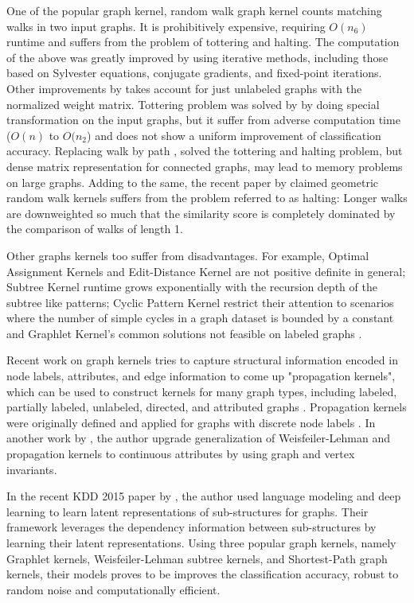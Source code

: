 \documentclass[12pt,a4paper]{article}
\numberwithin{equation}{section}
\numberwithin{figure}{section}
\numberwithin{table}{section}
\begin{document}
One of the popular graph kernel, random walk graph kernel \citep{Gartner2003, Kashima2003} counts matching walks in two input graphs. It is prohibitively expensive, requiring $O(n_{6})$ runtime and suffers from the problem of tottering and halting. The computation of the above was greatly improved by \citet{Vishwanathan2007} using iterative methods, including those based on Sylvester equations, conjugate gradients, and fixed-point iterations. Other improvements by \citet{Kang2012} takes account for just unlabeled graphs with the normalized weight matrix. Tottering problem was solved by \citet{Mahe2004} by doing special transformation on the input graphs, but it suffer from adverse computation time ($O(n)$ to $O(n_{2}$) and does not show a uniform improvement of classification accuracy. Replacing walk by path \citet{Borgwardt2005}, solved the tottering and  halting problem, but dense matrix representation for connected graphs, may lead to memory problems on large graphs. Adding to the same, the recent paper by \citet{Sugiyama2015} claimed geometric random walk kernels suffers from the problem  referred to as halting: Longer walks are downweighted so much that the similarity score is completely dominated by the comparison of walks of length 1.

Other graphs kernels too suffer from disadvantages. For example, Optimal Assignment Kernels and Edit-Distance Kernel are not positive definite in general; Subtree Kernel runtime grows exponentially with the recursion depth of the subtree like patterns; Cyclic Pattern Kernel restrict their attention to scenarios where the number of simple cycles in a graph dataset is bounded by a constant and Graphlet Kernel's common solutions not feasible on labeled graphs \citep{Vishwanathan2010}.

Recent work on graph kernels tries to capture structural information encoded in node labels, attributes, and edge information to come up "propagation kernels", which can be used to construct kernels for many graph types, including labeled, partially labeled, unlabeled, directed, and attributed graphs \citep{Neumann2015}. Propagation kernels were originally defined and applied for graphs with discrete node labels \citep{Shervashidze2011}. In another work by \citet{Francesco2015}, the author upgrade generalization of Weisfeiler-Lehman \citep{Shervashidze2011} and propagation kernels \citep{Neumann2015} to continuous attributes by using graph and vertex invariants.

In the recent KDD 2015 paper by \citet{Yanardag2015}, the author used language modeling and deep learning to learn latent representations of sub-structures for graphs. Their framework leverages the dependency information between sub-structures by learning their latent representations. Using three popular graph kernels, namely Graphlet kernels, Weisfeiler-Lehman subtree kernels, and Shortest-Path graph kernels, their models proves to be improves the classification accuracy, robust to random noise and computationally efficient.
\end{document}

